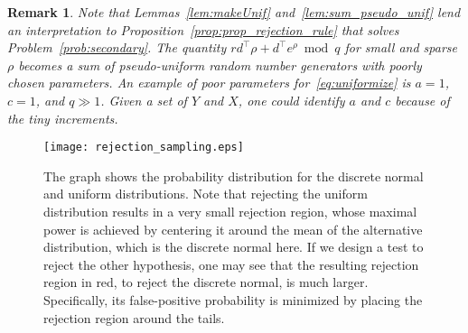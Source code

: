 \documentclass[journal, twoside, web]{ieeecolorpreprint}
\newtheorem{rem}{Remark}
\begin{document}
\begin{rem}
    Note that Lemmas~\ref{lem:makeUnif}
 and~\ref{lem:sum_pseudo_unif} lend an interpretation to Proposition~\ref{prop:prop_rejection_rule} that solves Problem~\ref{prob:secondary}. The quantity $rd^\top \rho + d^\top e^\rho \bmod q$ for small and sparse $\rho$ becomes a sum of pseudo-uniform random number generators with poorly chosen parameters. An example of poor parameters for~\eqref{eq:uniformize} is $a=1$, $c=1$, and $q\gg1$. Given a set of $Y$ and $X$, one could identify $a$ and $c$ because of the tiny increments.
 \end{rem}
\begin{figure}
    \centering
    \texttt{[image: rejection\_sampling.eps]}
    \caption{The graph shows the probability distribution for the discrete normal and uniform distributions. Note that rejecting the uniform distribution results in a very small rejection region, whose maximal power is achieved by centering it around the mean of the alternative distribution, which is the discrete normal here. If we design a test to reject the other hypothesis, one may see that the resulting rejection region in red, to reject the discrete normal, is much larger. Specifically, its false-positive probability is minimized by placing the rejection region around the tails.}
    \label{fig:unif_norm}
\end{figure}


\end{document}
